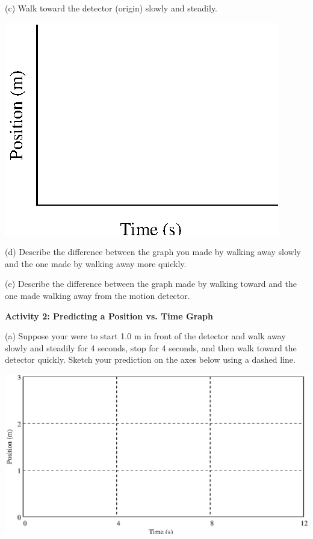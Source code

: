 (c) Walk toward the detector (origin) slowly and steadily.

\vspace{0.3cm}
{\par\centering \includegraphics{position_fig1.eps} \par}
\vspace{0.3cm}

(d) Describe the difference between the graph you made by walking away slowly
and the one made by walking away more quickly.
\vspace{20mm}

(e) Describe the difference between the graph made by walking toward and the
one made walking away from the motion detector.
\vspace{20mm}

\textbf{Activity 2: Predicting a Position vs. Time Graph} 

(a) Suppose your were to start 1.0 m in front of the detector and walk away
slowly and steadily for 4 seconds, stop for 4 seconds, and then walk toward
the detector quickly. Sketch your prediction on the axes below using a dashed
line.

\vspace{0.3cm}
{\par\centering \includegraphics{position_fig2.eps} \par}
\vspace{0.3cm}

